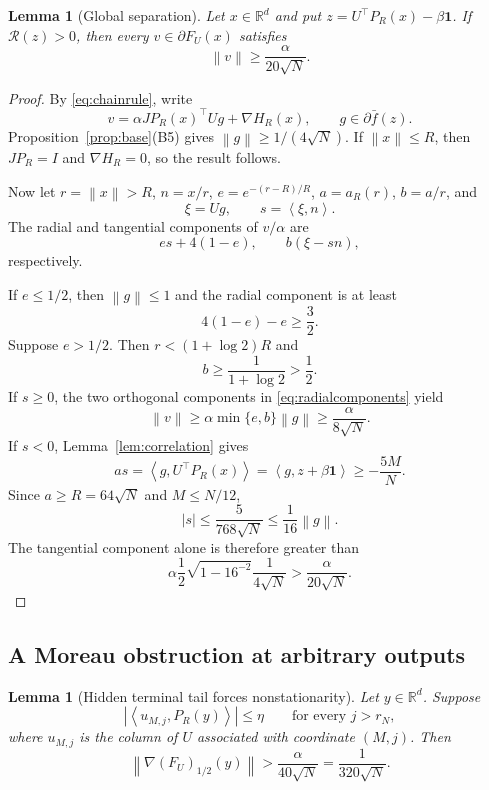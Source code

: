 \documentclass[11pt,a4paper]{article}
\newcommand{\R}{\mathbb{R}}
\newcommand{\one}{\mathbf 1}
\newcommand{\norm}[1]{\left\lVert #1\right\rVert}
\newcommand{\abs}[1]{\left\lvert #1\right\rvert}
\newcommand{\inner}[2]{\left\langle #1,#2\right\rangle}
\newtheorem{lemma}[theorem]{Lemma}
\theoremstyle{definition}
\numberwithin{equation}{section}
\begin{document}
\begin{lemma}[Global separation]\label{lem:separation}
Let $x\in\R^d$ and put $z=U^\top P_R(x)-\beta\one$.  If $\mathcal R(z)>0$, then every $v\in\partial F_U(x)$ satisfies
\begin{equation}\label{eq:sep}
 \norm v\ge\frac{\alpha}{20\sqrt N}.
\end{equation}
\end{lemma}

\begin{proof}
By \eqref{eq:chainrule}, write
\[
 v=\alpha JP_R(x)^\top Ug+\nabla H_R(x),
 \qquad
 g\in\partial\bar f(z).
\]
Proposition~\ref{prop:base}(B5) gives $\norm g\ge1/(4\sqrt N)$.  If $\norm x\le R$, then $JP_R=I$ and $\nabla H_R=0$, so the result follows.

Now let $r=\norm x>R$, $n=x/r$, $e=e^{-(r-R)/R}$, $a=a_R(r)$, $b=a/r$, and
\[
 \xi=Ug,
 \qquad
 s=\inner{\xi}{n}.
\]
The radial and tangential components of $v/\alpha$ are
\begin{equation}\label{eq:radialcomponents}
 e s+4(1-e),
 \qquad
 b(\xi-sn),
\end{equation}
respectively.

If $e\le1/2$, then $\norm g\le1$ and the radial component is at least
\[
 4(1-e)-e\ge\frac32.
\]
Suppose $e>1/2$.  Then $r<(1+\log2)R$ and
\[
 b\ge\frac1{1+\log2}>\frac12.
\]
If $s\ge0$, the two orthogonal components in \eqref{eq:radialcomponents} yield
\[
 \norm v\ge\alpha\min\{e,b\}\norm g
 \ge\frac{\alpha}{8\sqrt N}.
\]
If $s<0$, Lemma~\ref{lem:correlation} gives
\[
 as=\inner{g}{U^\top P_R(x)}
 =\inner{g}{z+\beta\one}\ge-\frac{5M}{N}.
\]
Since $a\ge R=64\sqrt N$ and $M\le N/12$,
\[
 \abs s\le\frac{5}{768\sqrt N}
 \le\frac1{16}\norm g.
\]
The tangential component alone is therefore greater than
\[
 \alpha\frac12\sqrt{1-16^{-2}}\frac1{4\sqrt N}
 >\frac{\alpha}{20\sqrt N}.
\]
\end{proof}

\subsection{A Moreau obstruction at arbitrary outputs}\label{sec:moreau}

\begin{lemma}[Hidden terminal tail forces nonstationarity]\label{lem:moreau}
Let $y\in\R^d$.  Suppose
\begin{equation}\label{eq:tailhidden}
 \abs{\inner{u_{M,j}}{P_R(y)}}\le\eta
 \qquad\text{for every }j>r_N,
\end{equation}
where $u_{M,j}$ is the column of $U$ associated with coordinate $(M,j)$.  Then
\begin{equation}\label{eq:moreaulower}
 \norm{\nabla(F_U)_{1/2}(y)}
 >\frac{\alpha}{40\sqrt N}
 =\frac1{320\sqrt N}.
\end{equation}
\end{lemma}
\end{document}
